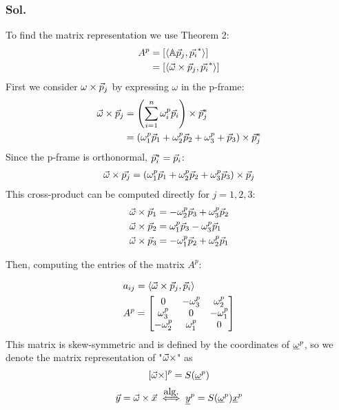 \documentclass{article}
\begin{document}
\subsubsection*{Sol.}
To find the matrix representation we use Theorem 2:
\begin{align*}
    A^p &= \left[\left<\mathbb{A}\vec{p}_j, \vec{p_i}^*\right>\right] \\
    &=  \left[\left<\vec{\omega} \times \vec{p}_j, \vec{p_i}^*\right>\right]
\end{align*}
First we consider $\omega \times \vec{p}_j$ by expressing $\omega$ in the p-frame:
\begin{align*}
    \vec{\omega} \times \vec{p}_j &= \left(\sum_{i=1}^n\omega_i^p\vec{p}_i\right) \times \vec{p}^*_j  \\
    &= (\omega_1^p\vec{p}_1 + \omega_2^p\vec{p}_2 + \omega_3^p + \vec{p}_3) \times \vec{p}^*_j \\
\end{align*}
Since the p-frame is orthonormal, $\vec{p}^*_i = \vec{p}_i$:
\begin{align*}
    \vec{\omega} \times \vec{p_j} = (\omega_1^p\vec{p}_1 + \omega_2^p\vec{p}_2 + \omega_3^p\vec{p}_3) \times \vec{p}_j 
\end{align*}
This cross-product can be computed directly for $j = 1,2,3$:
\begin{align*}
    &\vec{\omega}\times\vec{p}_1 = -\omega_2^p\vec{p}_3  + \omega_3^p\vec{p}_2 \\
    &\vec{\omega}\times\vec{p}_2 = \omega_1^p\vec{p}_3  - \omega_3^p\vec{p}_1 \\
    &\vec{\omega}\times\vec{p}_3 = -\omega_1^p\vec{p}_2  + \omega_2^p\vec{p}_1 
\end{align*}

Then, computing the entries of the matrix $A^p$:

\begin{align*}
    &a_{ij} = \left<\vec{\omega}\times\vec{p}_j, \vec{p}_i\right>\\
    &A^p = \begin{bmatrix}
        0 & -\omega_3^p & \omega_2^p \\
        \omega_3^p & 0 & -\omega_1^p \\
        -\omega_2^p &\omega_1^p& 0
    \end{bmatrix}
\end{align*}
This matrix is skew-symmetric and is defined by the coordinates of $\underline{\omega}^p$, so we denote the matrix representation of "$\vec{\omega} \times$" as
$$\left[\vec{\omega} \times \right]^p = S(\underline{\omega}^p)$$
$$\q{y} = \q{\omega}\times\q{x} \algeq \aq{y}^p = S(\aq{\omega}^p)\aq{x}^p$$
\end{document}
